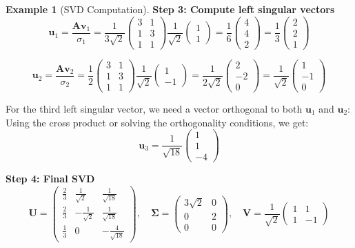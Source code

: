 \documentclass[12pt]{article}
\numberwithin{equation}{section}
\newcommand{\vect}[1]{\boldsymbol{#1}}   %
\newcommand{\mat}[1]{\mathbf{#1}}        %
\theoremstyle{plain}
\theoremstyle{definition}
\newtheorem{example}[theorem]{Example}
\theoremstyle{remark}
\begin{document}
\begin{example}[SVD Computation]
\textbf{Step 3: Compute left singular vectors}
$$\vect{u}_1 = \frac{\mat{A}\vect{v}_1}{\sigma_1} = \frac{1}{3\sqrt{2}}\begin{pmatrix} 3 & 1 \\ 1 & 3 \\ 1 & 1 \end{pmatrix}\frac{1}{\sqrt{2}}\begin{pmatrix} 1 \\ 1 \end{pmatrix} = \frac{1}{6}\begin{pmatrix} 4 \\ 4 \\ 2 \end{pmatrix} = \frac{1}{3}\begin{pmatrix} 2 \\ 2 \\ 1 \end{pmatrix}$$

$$\vect{u}_2 = \frac{\mat{A}\vect{v}_2}{\sigma_2} = \frac{1}{2}\begin{pmatrix} 3 & 1 \\ 1 & 3 \\ 1 & 1 \end{pmatrix}\frac{1}{\sqrt{2}}\begin{pmatrix} 1 \\ -1 \end{pmatrix} = \frac{1}{2\sqrt{2}}\begin{pmatrix} 2 \\ -2 \\ 0 \end{pmatrix} = \frac{1}{\sqrt{2}}\begin{pmatrix} 1 \\ -1 \\ 0 \end{pmatrix}$$

For the third left singular vector, we need a vector orthogonal to both $\vect{u}_1$ and $\vect{u}_2$:
Using the cross product or solving the orthogonality conditions, we get:
$$\vect{u}_3 = \frac{1}{\sqrt{18}}\begin{pmatrix} 1 \\ 1 \\ -4 \end{pmatrix}$$

\textbf{Step 4: Final SVD}
$$\mat{U} = \begin{pmatrix} \frac{2}{3} & \frac{1}{\sqrt{2}} & \frac{1}{\sqrt{18}} \\ \frac{2}{3} & -\frac{1}{\sqrt{2}} & \frac{1}{\sqrt{18}} \\ \frac{1}{3} & 0 & -\frac{4}{\sqrt{18}} \end{pmatrix}, \quad \mat{\Sigma} = \begin{pmatrix} 3\sqrt{2} & 0 \\ 0 & 2 \\ 0 & 0 \end{pmatrix}, \quad \mat{V} = \frac{1}{\sqrt{2}}\begin{pmatrix} 1 & 1 \\ 1 & -1 \end{pmatrix}$$
\end{example}
\end{document}
